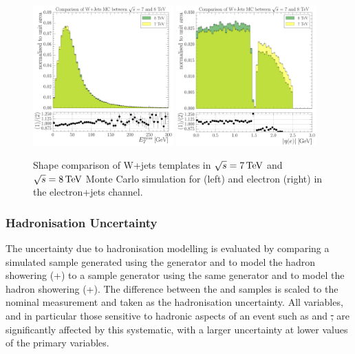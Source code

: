 \begin{figure}[hbtp]
    \centering
     \includegraphics[width=0.48\textwidth]{Chapters/04_Analysis/04b_XSections/images/WJets_comparison/TTbar_plus_X_analysis_EPlusJets_Refselection_MET_patType1CorrectedPFMet_MET_0orMoreBtag.pdf}\hfill
     \includegraphics[width=0.48\textwidth]{Chapters/04_Analysis/04b_XSections/images/WJets_comparison/TTbar_plus_X_analysis_EPlusJets_Refselection_Electron_electron_AbsEta_0orMoreBtag.pdf}\\
	 \caption{Shape comparison of W+jets templates in $\sqrt{s}=7\,\text{Te\hspace{-.08em}V}$ and $\sqrt{s}=8\,\text{Te\hspace{-.08em}V}$ Monte Carlo
	 simulation for \met (left) and electron \abseta (right) in the electron+jets channel.}
     \label{fig:wjets_7TeV_8TeV_comparison}
\end{figure}

\subsubsection{Hadronisation Uncertainty}
\label{sss:hadronisation_uncertainty}
The uncertainty due to hadronisation modelling is evaluated by comparing a simulated sample
generated using the \POWHEG generator and \PYTHIA to model the hadron showering (\POWHEG+\PYTHIA) to a sample
generator using the same \POWHEG generator and \HERWIG to model the hadron showering (\POWHEG+\HERWIG). The
difference between the \PYTHIA and \HERWIG samples is scaled to the nominal measurement and taken as the
hadronisation uncertainty. All variables, and in particular those sensitive to hadronic aspects of an event
such as \HT and \st, are significantly affected by this systematic, with a larger uncertainty at lower
values of the primary variables. %

